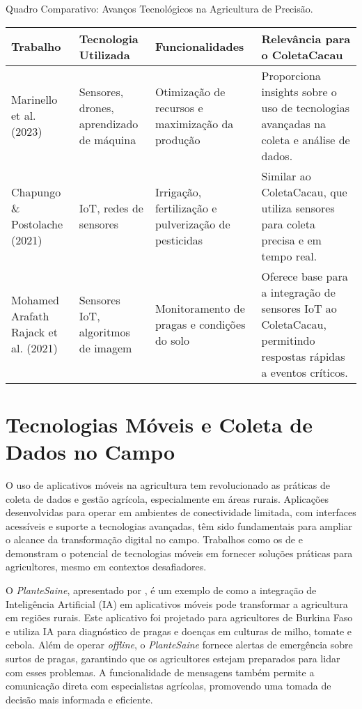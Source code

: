 \begin{quadro}[!htb]
    \centering
    \footnotesize
    \caption{Quadro Comparativo: Avanços Tecnológicos na Agricultura de Precisão.}
	\begin{tabular}{|p{3cm}|p{2cm}|p{3cm}|p{5cm}|}
	   \hline
	   \textbf{Trabalho} & \centering\textbf{Tecnologia Utilizada} & \textbf{Funcionalidades} & \textbf{Relevância para o ColetaCacau}\\
	   \hline
            Marinello et al. (2023) & Sensores, drones, aprendizado de máquina & Otimização de recursos e maximização da produção & Proporciona insights sobre o uso de tecnologias avançadas na coleta e análise de dados. \\ 
        \hline
            Chapungo \& Postolache (2021) & IoT, redes de sensores & Irrigação, fertilização e pulverização de pesticidas & Similar ao ColetaCacau, que utiliza sensores para coleta precisa e em tempo real. \\ 
        \hline
            Mohamed Arafath Rajack et al. (2021) & Sensores IoT, algoritmos de imagem & Monitoramento de pragas e condições do solo & Oferece base para a integração de sensores IoT ao ColetaCacau, permitindo respostas rápidas a eventos críticos. \\ 
        \hline
	\end{tabular}
    \label{Tab:PrecisionAgriculture}
\end{quadro}

\newpage
\section{Tecnologias Móveis e Coleta de Dados no Campo}
O uso de aplicativos móveis na agricultura tem revolucionado as práticas de coleta de dados e gestão agrícola, especialmente em áreas rurais. Aplicações desenvolvidas para operar em ambientes de conectividade limitada, com interfaces acessíveis e suporte a tecnologias avançadas, têm sido fundamentais para ampliar o alcance da transformação digital no campo. Trabalhos como os de \cite{Appiah2024PlanteSaineAA} e \cite{Osman2022MOBILEUI} demonstram o potencial de tecnologias móveis em fornecer soluções práticas para agricultores, mesmo em contextos desafiadores.

O \textit{PlanteSaine}, apresentado por \cite{Appiah2024PlanteSaineAA}, é um exemplo de como a integração de Inteligência Artificial (IA) em aplicativos móveis pode transformar a agricultura em regiões rurais. Este aplicativo foi projetado para agricultores de Burkina Faso e utiliza IA para diagnóstico de pragas e doenças em culturas de milho, tomate e cebola. Além de operar \textit{offline}, o \textit{PlanteSaine} fornece alertas de emergência sobre surtos de pragas, garantindo que os agricultores estejam preparados para lidar com esses problemas. A funcionalidade de mensagens também permite a comunicação direta com especialistas agrícolas, promovendo uma tomada de decisão mais informada e eficiente.

